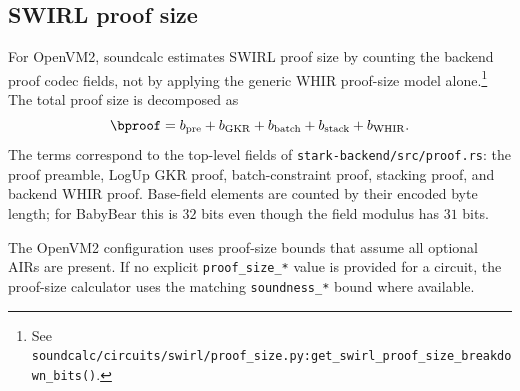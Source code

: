 \subsection{SWIRL proof size}

For OpenVM2, soundcalc estimates SWIRL proof size by counting the backend proof
codec fields, not by applying the generic WHIR proof-size model alone.\footnote{See
\texttt{soundcalc/circuits/swirl/proof\_size.py:get\_swirl\_proof\_size\_breakdown\_bits()}.}
The total proof size is decomposed as
\[
\bproof =
b_{\mathrm{pre}} + b_{\mathrm{GKR}} + b_{\mathrm{batch}}
+ b_{\mathrm{stack}} + b_{\mathrm{WHIR}}.
\]
The terms correspond to the top-level fields of
\texttt{stark-backend/src/proof.rs}: the proof preamble, LogUp GKR proof,
batch-constraint proof, stacking proof, and backend WHIR proof. Base-field
elements are counted by their encoded byte length; for BabyBear this is
\(32\) bits even though the field modulus has \(31\) bits.

The OpenVM2 configuration uses proof-size bounds that assume all optional AIRs
are present. If no explicit \texttt{proof\_size\_*} value is provided for a
circuit, the proof-size calculator uses the matching \texttt{soundness\_*}
bound where available.
